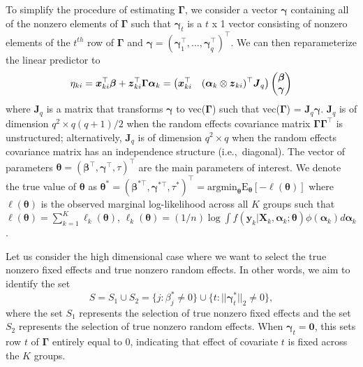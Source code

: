 To simplify the procedure of estimating \(\boldsymbol \Gamma\), we
consider a vector \(\boldsymbol \gamma\) containing all of the nonzero
elements of \(\boldsymbol \Gamma\) such that \(\boldsymbol \gamma_t\) is
a \(t\) x 1 vector consisting of nonzero elements of the \(t^{th}\) row
of \(\boldsymbol \Gamma\) and
\(\boldsymbol \gamma = (\boldsymbol \gamma_1^\top,...,\boldsymbol \gamma_{q}^\top)^\top\).
We can then reparameterize the linear predictor
\citep{chen2003, BICq2011} to 
\begin{equation}
  \eta_{ki} = \boldsymbol x_{ki}^\top \boldsymbol\beta + \boldsymbol z_{ki}^\top \boldsymbol\Gamma \boldsymbol\alpha_k = \left (\boldsymbol x_{ki}^\top \hspace{10 pt} (\boldsymbol\alpha_k \otimes \boldsymbol z_{ki})^\top \boldsymbol J_q \right)
  \left (
  \begin{matrix}
    \boldsymbol\beta \\ \boldsymbol\gamma 
  \end{matrix}
  \right )
  \label{eqn:linpredJ}
\end{equation} where \(\boldsymbol J_q\) is a matrix that transforms
\(\boldsymbol \gamma\) to vec(\(\boldsymbol \Gamma\)) such that
vec(\(\boldsymbol \Gamma\)) = \(\boldsymbol J_q \boldsymbol \gamma\). \(\boldsymbol J_q\) is of
dimension \(q^2 \times q(q + 1)/2\) when the random effects
covariance matrix \(\boldsymbol{\Gamma \Gamma}^\top\) is unstructured;
alternatively, \(\boldsymbol J_q\) is of dimension \(q^2 \times q\) when the
random effects covariance matrix has an independence structure
(i.e.,~diagonal). The vector of parameters
\(\boldsymbol \theta = (\boldsymbol \beta^\top, \boldsymbol \gamma^\top, \tau)^\top\)
are the main parameters of interest. We denote the true value of
\(\boldsymbol \theta\) as
\(\boldsymbol \theta^{*} = (\boldsymbol \beta^{*\top}, \boldsymbol \gamma^{*\top}, \tau^{*})^\top = \text{argmin}_{\boldsymbol \theta}\text{E}_{\boldsymbol\theta}[-\ell(\boldsymbol \theta)]\)
where \(\ell(\boldsymbol \theta)\) is the observed marginal
log-likelihood across all \(K\) groups such that
\(\ell(\boldsymbol \theta) = \sum_{k=1}^K \ell_k(\boldsymbol \theta)\),
\(\ell_k(\boldsymbol \theta) = (1/n) \log \int f(\boldsymbol y_k | \boldsymbol X_k, \boldsymbol \alpha_k; \boldsymbol \theta) \phi(\boldsymbol \alpha_k) d \boldsymbol \alpha_k\).

Let us consider the high dimensional case where we want to select the
true nonzero fixed effects and true nonzero random effects. In other words, we
aim to identify the set \begin{equation*}
  S = S_1 \cup S_2 = \{j: \beta_j^* \ne 0 \} \cup \{t: ||\boldsymbol\gamma_t^*||_2 \ne 0\},
\end{equation*} where the set \(S_1\) represents the selection of true
nonzero fixed effects and the set \(S_2\) represents the selection of true
nonzero random effects. When \(\boldsymbol \gamma_t = \boldsymbol 0\),
this sets row \(t\) of \(\boldsymbol \Gamma\) entirely equal to 0,
indicating that effect of covariate \(t\) is fixed across the \(K\)
groups.

